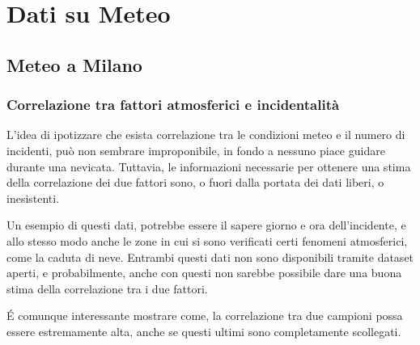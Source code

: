 \documentclass[a4paper,12pt]{report}
\begin{document}
\chapter{Dati su Meteo}

\section{Meteo a Milano}

\subsection{Correlazione tra fattori atmosferici e incidentalità}

L'idea di ipotizzare che esista correlazione tra le condizioni meteo e il numero 
di incidenti, può non sembrare improponibile, in fondo a nessuno piace guidare 
durante una nevicata.
Tuttavia, le informazioni necessarie per ottenere una stima della correlazione 
dei due fattori sono, o fuori dalla portata dei dati liberi, o inesistenti. 

Un esempio di questi dati, potrebbe essere il sapere giorno e ora 
dell'incidente, e allo stesso modo anche le zone in cui si sono verificati certi 
fenomeni atmosferici, come la caduta di neve. 
Entrambi questi dati non sono disponibili tramite dataset aperti, e probabilmente, 
anche con questi non sarebbe possibile dare una buona stima della correlazione 
tra i due fattori.

\'E comunque interessante mostrare come, la correlazione tra due campioni possa essere 
estremamente alta, anche se questi ultimi sono completamente scollegati.
\end{document}
